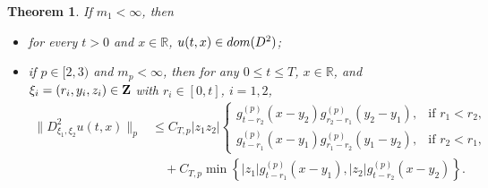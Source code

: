 \documentclass[10pt,a4paper]{amsart}
\newtheorem{theorem}{Theorem}[section]
\def\bR{\mathbb{R}}
\begin{document}
\begin{theorem}
\label{key-th-D2u}
If $m_1<\infty$, then
\begin{itemize}
\item[(i)] for every $t>0$ and $x\in\bR$, $u(t,x)\in{\rm dom}(D^2)$;
\item[(ii)] if $p\in[2,3)$ and $m_p<\infty$, then for any
$0\le t\le T$, $x\in\bR$, and
$\xi_i=(r_i,y_i,z_i)\in{\bf Z}$ with $r_i\in[0,t]$, $i=1,2$,
\begin{equation}
\label{D2u-nonlinear-bound}
\begin{aligned}
\|D^2_{\xi_1,\xi_2}u(t,x)\|_p
&\le
C_{T,p}|z_1z_2|
\begin{cases}
g_{t-r_2}^{(p)}(x-y_2)
g_{r_2-r_1}^{(p)}(y_2-y_1),
& \text{if } r_1<r_2, \\[0.3em]
g_{t-r_1}^{(p)}(x-y_1)
g_{r_1-r_2}^{(p)}(y_1-y_2),
& \text{if } r_2<r_1,
\end{cases}
\\
&\quad+
C_{T,p}
\min\left\{
|z_1|g_{t-r_1}^{(p)}(x-y_1),
|z_2|g_{t-r_2}^{(p)}(x-y_2)
\right\}.
\end{aligned}
\end{equation}
\end{itemize}
\end{theorem}
\end{document}
